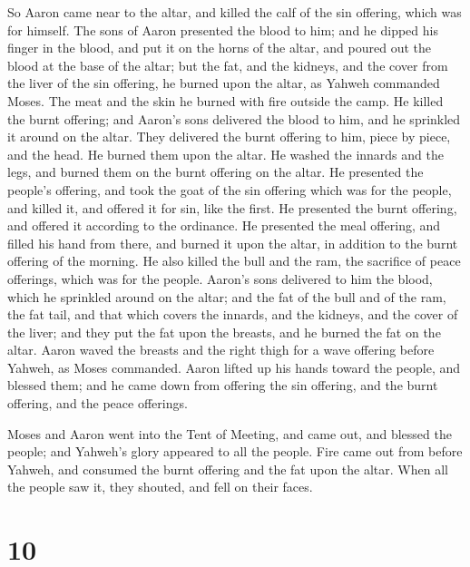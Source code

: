  So Aaron came near to the altar, and killed the calf of
the sin offering, which was for himself.  The sons of
Aaron presented the blood to him; and he dipped his finger in the blood,
and put it on the horns of the altar, and poured out the blood at the
base of the altar;  but the fat, and the kidneys, and the
cover from the liver of the sin offering, he burned upon the altar, as
Yahweh commanded Moses.  The meat and the skin he burned
with fire outside the camp.  He killed the burnt
offering; and Aaron's sons delivered the blood to him, and he sprinkled
it around on the altar.  They delivered the burnt
offering to him, piece by piece, and the head. He burned them upon the
altar.  He washed the innards and the legs, and burned
them on the burnt offering on the altar.  He presented
the people's offering, and took the goat of the sin offering which was
for the people, and killed it, and offered it for sin, like the first.
 He presented the burnt offering, and offered it
according to the ordinance.  He presented the meal
offering, and filled his hand from there, and burned it upon the altar,
in addition to the burnt offering of the morning.  He
also killed the bull and the ram, the sacrifice of peace offerings,
which was for the people. Aaron's sons delivered to him the blood, which
he sprinkled around on the altar;  and the fat of the
bull and of the ram, the fat tail, and that which covers the innards,
and the kidneys, and the cover of the liver;  and they
put the fat upon the breasts, and he burned the fat on the altar.
 Aaron waved the breasts and the right thigh for a wave
offering before Yahweh, as Moses commanded.  Aaron lifted
up his hands toward the people, and blessed them; and he came down from
offering the sin offering, and the burnt offering, and the peace
offerings.

 Moses and Aaron went into the Tent of Meeting, and came
out, and blessed the people; and Yahweh's glory appeared to all the
people.  Fire came out from before Yahweh, and consumed
the burnt offering and the fat upon the altar. When all the people saw
it, they shouted, and fell on their faces.

\hypertarget{section-9}{%
\section{10}\label{section-9}}


